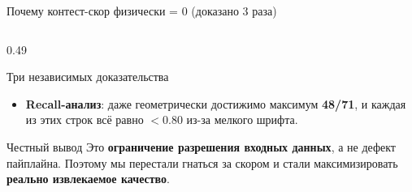 \documentclass[aspectratio=169,10pt]{beamer}
\newcommand{\hl}[1]{{\bfseries\color{accent}#1}}
\newcommand{\hr}[1]{{\bfseries\color{redtag}#1}}
\newcommand{\hg}[1]{{\bfseries\color{good}#1}}
\begin{document}
\begin{frame}{Почему контест-скор физически = 0 (доказано 3 раза)}
\begin{columns}[T,onlytextwidth]
\begin{column}{0.49\textwidth}
\begin{block}{Три независимых доказательства}
\begin{itemize}
            сигнале (см.\ слева).
          \item[\textbf{3.}] \hl{Recall-анализ}: даже геометрически
            достижимо максимум \hr{48/71}, и каждая из этих строк всё равно
            $<$0.80 из-за мелкого шрифта.
        \end{itemize}
      \end{block}
      \vspace{0.2em}
      \begin{block}{Честный вывод}\footnotesize
        Это \hr{ограничение разрешения входных данных}, а не дефект
        пайплайна. Поэтому мы перестали гнаться за скором и стали
        максимизировать \hg{реально извлекаемое качество}.
      \end{block}
    \end{column}
  \end{columns}
\end{frame}
\end{document}
